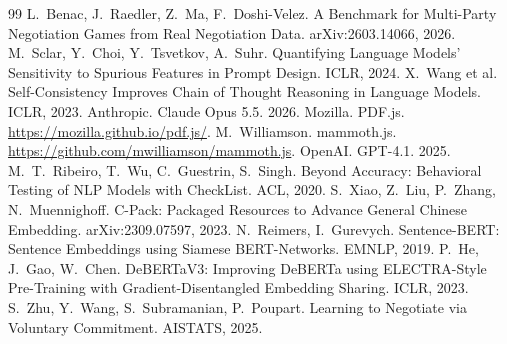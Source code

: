 \documentclass[10pt,twocolumn,letterpaper]{article}
\begin{document}
\begin{thebibliography}{99}\small
{} L.~Benac, J.~Raedler, Z.~Ma, F.~Doshi-Velez. A Benchmark for Multi-Party Negotiation Games from Real Negotiation Data. arXiv:2603.14066, 2026.
 M.~Sclar, Y.~Choi, Y.~Tsvetkov, A.~Suhr. Quantifying Language Models' Sensitivity to Spurious Features in Prompt Design. ICLR, 2024.
 X.~Wang et al. Self-Consistency Improves Chain of Thought Reasoning in Language Models. ICLR, 2023.
 Anthropic. Claude Opus 5.5. 2026.
 Mozilla. PDF.js. \url{https://mozilla.github.io/pdf.js/}.
 M.~Williamson. mammoth.js. \url{https://github.com/mwilliamson/mammoth.js}.
 OpenAI. GPT-4.1. 2025.
 M.~T.~Ribeiro, T.~Wu, C.~Guestrin, S.~Singh. Beyond Accuracy: Behavioral Testing of NLP Models with CheckList. ACL, 2020.
 S.~Xiao, Z.~Liu, P.~Zhang, N.~Muennighoff. C-Pack: Packaged Resources to Advance General Chinese Embedding. arXiv:2309.07597, 2023.
 N.~Reimers, I.~Gurevych. Sentence-BERT: Sentence Embeddings using Siamese BERT-Networks. EMNLP, 2019.
 P.~He, J.~Gao, W.~Chen. DeBERTaV3: Improving DeBERTa using ELECTRA-Style Pre-Training with Gradient-Disentangled Embedding Sharing. ICLR, 2023.
 S.~Zhu, Y.~Wang, S.~Subramanian, P.~Poupart. Learning to Negotiate via Voluntary Commitment. AISTATS, 2025.
\end{thebibliography}
\end{document}

